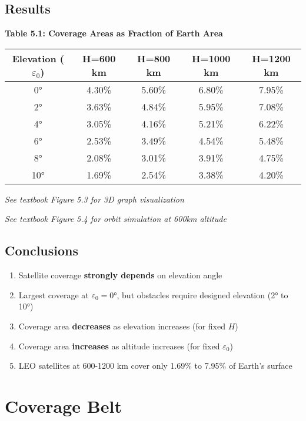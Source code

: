 \documentclass[11pt,letterpaper]{article}
\begin{document}
\subsection{Results}

\textbf{Table 5.1: Coverage Areas as Fraction of Earth Area}

\begin{center}
\begin{tabular}{|c|c|c|c|c|}
\hline
\textbf{Elevation ($\varepsilon_0$)} & \textbf{H=600 km} & \textbf{H=800 km} & \textbf{H=1000 km} & \textbf{H=1200 km} \\
\hline
0° & 4.30\% & 5.60\% & 6.80\% & 7.95\% \\
2° & 3.63\% & 4.84\% & 5.95\% & 7.08\% \\
4° & 3.05\% & 4.16\% & 5.21\% & 6.22\% \\
6° & 2.53\% & 3.49\% & 4.54\% & 5.48\% \\
8° & 2.08\% & 3.01\% & 3.91\% & 4.75\% \\
10° & 1.69\% & 2.54\% & 3.38\% & 4.20\% \\
\hline
\end{tabular}
\end{center}

\textit{See textbook Figure 5.3 for 3D graph visualization}

\textit{See textbook Figure 5.4 for orbit simulation at 600km altitude}

\subsection{Conclusions}
\begin{enumerate}
    \item Satellite coverage \textbf{strongly depends} on elevation angle
    \item Largest coverage at $\varepsilon_0 = 0°$, but obstacles require designed elevation (2° to 10°)
    \item Coverage area \textbf{decreases} as elevation increases (for fixed $H$)
    \item Coverage area \textbf{increases} as altitude increases (for fixed $\varepsilon_0$)
    \item LEO satellites at 600-1200 km cover only 1.69\% to 7.95\% of Earth's surface
\end{enumerate}

\section{Coverage Belt}
\end{document}
